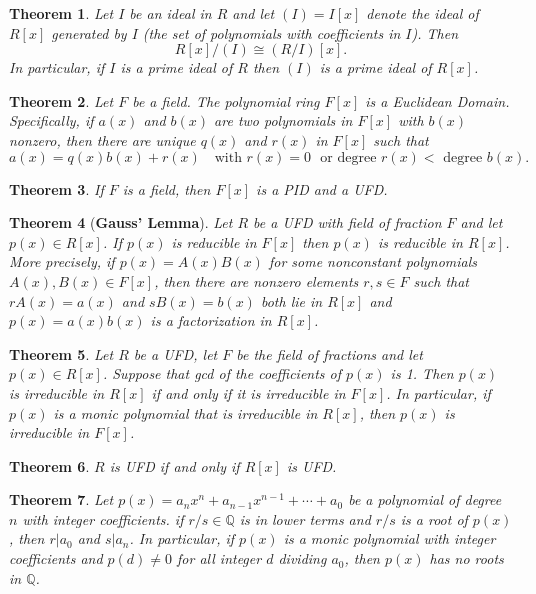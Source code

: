 \documentclass[answers, a4paper, 12pt]{exam}
\newtheorem{theorem}{Theorem}[section]
\newcommand{\Q}{\mathbb{Q}}
\begin{document}
\begin{theorem}
    Let $I$ be an ideal in $R$ and let $(I)=I[x]$ denote the ideal of $R[x]$ generated by $I$ (the set of polynomials with coefficients in $I$). Then $$R[x]/(I)\cong(R/I)[x].$$
    In particular, if $I$ is a prime ideal of $R$ then $(I)$ is a prime ideal of $R[x]$.
\end{theorem}

\begin{theorem}
    Let $F$ be a field. The polynomial ring $F[x]$ is a Euclidean Domain. Specifically, if $a(x)$ and $b(x)$ are two polynomials in $F[x]$ with $b(x)$ nonzero, then there are unique $q(x)$ and $r(x)$ in $F[x]$ such that
    $$a(x)=q(x)b(x)+r(x)\,\,\,\,\text{ with } r(x)=0\,\,\text{ or degree $r(x)<$ degree $b(x)$}.$$
\end{theorem}

\begin{theorem}
    If $F$ is a field, then $F[x]$ is a PID and a UFD.
\end{theorem}

\begin{theorem}[\textbf{Gauss' Lemma}]
    Let $R$ be a UFD with field of fraction $F$ and let $p(x)\in R[x]$. If $p(x)$ is reducible in $F[x]$ then $p(x)$ is reducible in $R[x]$. More precisely, if $p(x)=A(x)B(x)$ for some nonconstant polynomials $A(x), B(x)\in F[x]$, then there are nonzero elements $r,s\in F$ such that $rA(x)=a(x)$ and $sB(x)=b(x)$ both lie in $R[x]$ and $p(x)=a(x)b(x)$ is a factorization in $R[x]$.
\end{theorem}

\begin{theorem}
    Let $R$ be a UFD, let $F$ be the field of fractions and let $p(x)\in R[x]$. Suppose that gcd of the coefficients of $p(x)$ is 1. Then $p(x)$ is irreducible in $R[x]$ if and only if it is irreducible in $F[x]$. In particular, if $p(x)$ is a monic polynomial that is irreducible in $R[x]$, then $p(x)$ is irreducible in $F[x]$.
\end{theorem}

\begin{theorem}
    $R$ is UFD if and only if $R[x]$ is UFD.
\end{theorem}

\begin{theorem}
    Let $p(x)=a_nx^n+a_{n-1}x^{n-1}+\cdots+a_0$ be a polynomial of degree $n$ with integer coefficients. if $r/s\in\Q$ is in lower terms and $r/s$ is a root of $p(x)$, then $r|a_0$ and $s|a_n$. In particular, if $p(x)$ is a monic polynomial with integer coefficients and $p(d)\neq0$ for all integer $d$ dividing $a_0$, then $p(x)$ has no roots in $\Q$.
\end{theorem}
\end{document}
